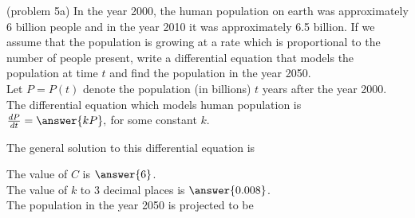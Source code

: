 \documentclass{ximera}
\begin{document}
\begin{problem}(problem 5a)
In the year 2000, the human population on earth was approximately 6 billion people and in the year 2010 it was approximately 6.5 billion. 
If we assume that the population is growing at a rate which is proportional to the number of people present,
write a differential equation that models the population at time $t$ and find the population in the year 2050.\\


Let $P = P(t)$ denote the population  (in billions)  $t$ years after the year 2000.\\
The differential equation which models human population is\\

$\frac{dP}{dt} = \answer{k P},$ for some constant $k$.

The general solution to this differential equation is 

\begin{multipleChoice}
\end{multipleChoice}

The value of $C$ is $\answer{6}$.\\
The value of $k$ to 3 decimal places is $\answer{0.008}$.\\
The population in the year 2050 is projected to be 

\begin{multipleChoice}
\end{multipleChoice}

\end{problem}
\end{document}
